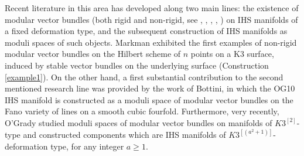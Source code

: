 \documentclass[12pt,a4paper]{amsart}
\theoremstyle{plain}
\theoremstyle{definition}
\theoremstyle{remark}
\begin{document}
Recent literature in this area has developed along two main lines: the existence of modular vector bundles (both rigid and non-rigid, see \cite{OG22}, \cite{markmanstable}, \cite{Fat24}, \cite{FO24}, \cite{FT25}) on IHS manifolds of a fixed deformation type, and the subsequent construction of IHS manifolds as moduli spaces of such objects. 
Markman \cite{markmanstable} exhibited the first examples of non-rigid modular vector bundles on the Hilbert scheme of $n$ points on a K3 surface, induced by stable vector bundles on the underlying surface (Construction \ref{example1}).
On the other hand, a first substantial contribution to the second mentioned research line was provided by the work \cite{Bot24a, Bot24b} of Bottini, in which the OG10 IHS manifold is constructed as a moduli space of modular vector bundles on the Fano variety of lines on a smooth cubic fourfold. Furthermore, very recently, O'Grady \cite{OGrady2026,OG26c} studied moduli spaces  of modular vector bundles on manifolds of $K3^{[2]}$-type and constructed components which  are IHS manifolds of  $K3^{[(a^2+1)]}$-deformation type, for any integer $a\geq 1$.
\end{document}
